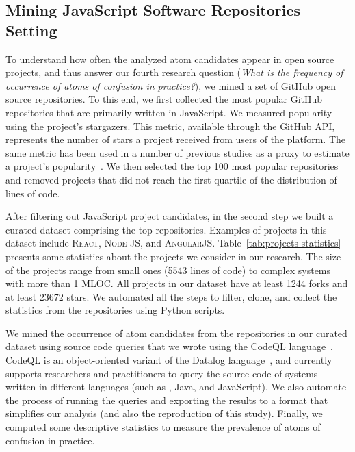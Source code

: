 \subsection{Mining JavaScript Software Repositories Setting}

To understand how often the analyzed atom candidates appear in open source projects, and thus answer our fourth research question (\emph{What is the frequency of occurrence of atoms of confusion in practice?}), we mined a set of GitHub open source repositories. To this end, we first collected the most popular GitHub repositories that are primarily written in JavaScript. We measured popularity using the project's stargazers. This metric, available through the GitHub API, represents the number of stars a project received from users of the platform. The same metric has been used in a number of previous studies as a proxy to estimate a project's popularity~\cite{gyimesi2019bugsjs,canedo:esem2020}. We then selected the top 100 most popular repositories and removed projects that did not reach the first quartile of the distribution of lines of code.

After filtering out JavaScript project candidates, in the second step we built a curated dataset comprising the top \minedprojects repositories. Examples of projects in this dataset include \textsc{React}, \textsc{Node JS}, and \textsc{AngularJS}. Table~\ref{tab:projects-statistics} presents some statistics about the projects we consider in our research. The size of the projects range from small ones (5543 lines of code) to complex systems with more than 1 MLOC. All projects in our dataset have at least \num{1244} forks and at least \num{23672} stars. We automated all the steps to filter, clone, and collect the statistics from the repositories using Python scripts.

We mined the occurrence of atom candidates from the repositories in our curated dataset using source code queries that we wrote using the CodeQL language~\cite{moor:gttse2007}. CodeQL is an object-oriented variant of the Datalog language~\cite{rodriguez2020efficient}, and currently supports researchers and practitioners to query the source code of systems written in different languages (such as \cpplang, Java, and JavaScript). We also automate the process of running the queries and exporting the results to a format that simplifies our analysis (and also the reproduction of this study). Finally, we computed some descriptive statistics to measure the prevalence of atoms of confusion in practice. 


